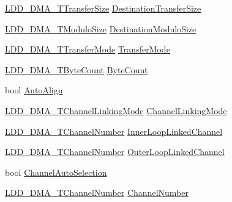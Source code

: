 \begin{DoxyCompactItemize}
\hyperlink{group___p_e___types__module_ga868f08f9448e5df27a38314f0893d84a}{L\+D\+D\+\_\+\+D\+M\+A\+\_\+\+T\+Transfer\+Size} \hyperlink{struct_l_d_d___d_m_a___t_transfer_descriptor_aab2978b1b8d4a4774a5e2c298d58479f}{Destination\+Transfer\+Size}
\item 
\hyperlink{group___p_e___types__module_gacf2f2d4310e7634351c68e1f64a4c483}{L\+D\+D\+\_\+\+D\+M\+A\+\_\+\+T\+Modulo\+Size} \hyperlink{struct_l_d_d___d_m_a___t_transfer_descriptor_a2d9a37eb9dc192ae554e0dca033a1e3e}{Destination\+Modulo\+Size}
\item 
\hyperlink{group___p_e___types__module_gacd7d4c29cfce815e9e44755c0153f31b}{L\+D\+D\+\_\+\+D\+M\+A\+\_\+\+T\+Transfer\+Mode} \hyperlink{struct_l_d_d___d_m_a___t_transfer_descriptor_a0a932c1e965e131c25e45159f71831fe}{Transfer\+Mode}
\item 
\hyperlink{group___p_e___types__module_gac001a681eb67942fa78ac9b62ba3b0d6}{L\+D\+D\+\_\+\+D\+M\+A\+\_\+\+T\+Byte\+Count} \hyperlink{struct_l_d_d___d_m_a___t_transfer_descriptor_aa02f90cb635b64ab6217e714bcdb1462}{Byte\+Count}
\item 
bool \hyperlink{struct_l_d_d___d_m_a___t_transfer_descriptor_a7cf775aea2661c99d4fc11d6d18f862c}{Auto\+Align}
\item 
\hyperlink{group___p_e___types__module_ga7a25c76afefd56aca723c89d7098c89b}{L\+D\+D\+\_\+\+D\+M\+A\+\_\+\+T\+Channel\+Linking\+Mode} \hyperlink{struct_l_d_d___d_m_a___t_transfer_descriptor_aad65e9cb849dda683d80af1dae92b5fb}{Channel\+Linking\+Mode}
\item 
\hyperlink{group___p_e___types__module_gad268d607015891269cb015faa8bc0dac}{L\+D\+D\+\_\+\+D\+M\+A\+\_\+\+T\+Channel\+Number} \hyperlink{struct_l_d_d___d_m_a___t_transfer_descriptor_a78eb4ce6c6e05add15799c5389637ce3}{Inner\+Loop\+Linked\+Channel}
\item 
\hyperlink{group___p_e___types__module_gad268d607015891269cb015faa8bc0dac}{L\+D\+D\+\_\+\+D\+M\+A\+\_\+\+T\+Channel\+Number} \hyperlink{struct_l_d_d___d_m_a___t_transfer_descriptor_a14137cdb670d104436bfdad1bb88f078}{Outer\+Loop\+Linked\+Channel}
\item 
bool \hyperlink{struct_l_d_d___d_m_a___t_transfer_descriptor_aae81aa421cebab862ae4b8ca9d384318}{Channel\+Auto\+Selection}
\item 
\hyperlink{group___p_e___types__module_gad268d607015891269cb015faa8bc0dac}{L\+D\+D\+\_\+\+D\+M\+A\+\_\+\+T\+Channel\+Number} \hyperlink{struct_l_d_d___d_m_a___t_transfer_descriptor_a22d5f3770a3c62c4bb7e426b4d5d96c8}{Channel\+Number}
\item 

\end{DoxyCompactItemize}
